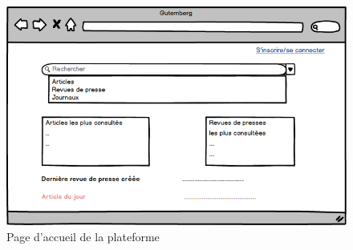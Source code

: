     \begin{figure}[H]
        \centering
        \includegraphics[width=\textwidth]{figures/Accueil.png}
            \caption{Page d'accueil de la plateforme}
            \label{fig:accueil}
    \end{figure}